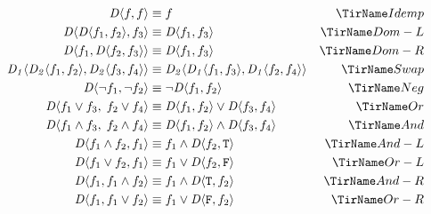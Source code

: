 \begin{align*}
  \chc[D]{f,f}
    & \equiv f
    & \rn{Idemp} \\
  \chc[D]{\chc[D]{f_1,f_2},f_3}
    & \equiv \chc[D]{f_1,f_3}
    & \rn{Dom-L} \\
  \chc[D]{f_1,\chc[D]{f_2,f_3}}
    & \equiv \chc[D]{f_1,f_3}
    & \rn{Dom-R} \\
  \chc[D_1]{\chc[D_2]{f_1,f_2},\chc[D_2]{f_3,f_4}}
    & \equiv \chc[D_2]{\chc[D_1]{f_1,f_3},\chc[D_1]{f_2,f_4}}
    & \rn{Swap} \\
  \chc[D]{\neg f_1,\neg f_2}
    & \equiv \neg\chc[D]{f_1,f_2}
    & \rn{Neg} \\
  \chc[D]{f_1\vee f_3,\;f_2\vee f_4}
    & \equiv \chc[D]{f_1,f_2}\vee\chc[D]{f_3,f_4}
    & \rn{Or} \\
  \chc[D]{f_1\wedge f_3,\;f_2\wedge f_4}
    & \equiv \chc[D]{f_1,f_2}\wedge\chc[D]{f_3,f_4}
    & \rn{And} \\
  \chc[D]{f_1\wedge f_2,f_1}
    & \equiv f_1\wedge\chc[D]{f_2,\tru}
    & \rn{And-L} \\
  \chc[D]{f_1\vee f_2,f_1}
    & \equiv f_1\vee\chc[D]{f_2,\fls}
    & \rn{Or-L} \\
  \chc[D]{f_1,f_1\wedge f_2}
    & \equiv f_1\wedge \chc[D]{\tru,f_2}
    & \rn{And-R} \\
  \chc[D]{f_1,f_1\vee f_2}
    & \equiv f_1\vee\chc[D]{\fls,f_2}
    & \rn{Or-R}
\end{align*}
